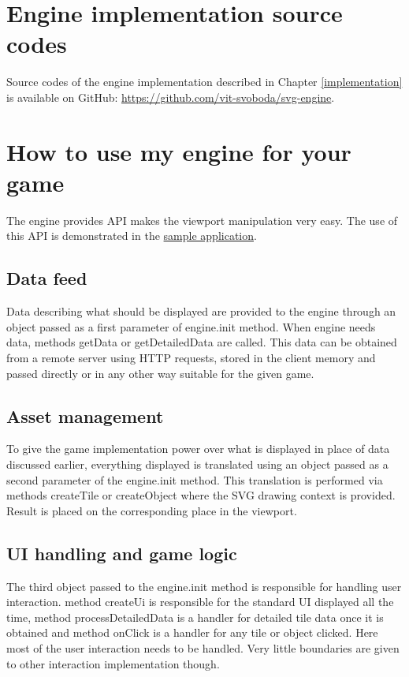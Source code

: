 \documentclass[11pt,oneside, final]{fithesis2}
\begin{document}

\appendix
\chapter{Engine implementation source codes}
Source codes of the engine implementation described in Chapter \ref{implementation} is available on GitHub: \href{https://github.com/vit-svoboda/svg-engine}{https://github.com/vit-svoboda/svg-engine}.

\chapter{How to use my engine for your game}
The engine provides API makes the viewport manipulation very easy. The use of this API is demonstrated in the \href{https://github.com/vit-svoboda/svg-engine/tree/master/src/main/webapp/Scripts/game}{sample application}.

\section{Data feed}
Data describing what should be displayed are provided to the engine through an object passed as a first parameter of engine.init method. When engine needs data, methods getData or getDetailedData are called. This data can be obtained from a remote server using HTTP requests, stored in the client memory and passed directly or in any other way suitable for the given game.

\section{Asset management}
To give the game implementation power over what is displayed in place of data discussed earlier, everything displayed is translated using an object passed as a second parameter of the engine.init method. This translation is performed via methods createTile or createObject where the SVG drawing context is provided. Result is placed on the corresponding place in the viewport.

\section{UI handling and game logic}
The third object passed to the engine.init method is responsible for handling user interaction. method createUi is responsible for the standard UI displayed all the time, method processDetailedData is a handler for detailed tile data once it is obtained and method onClick is a handler for any tile or object clicked. Here most of the user interaction needs to be handled. Very little boundaries are given to other interaction implementation though.
\end{document}
